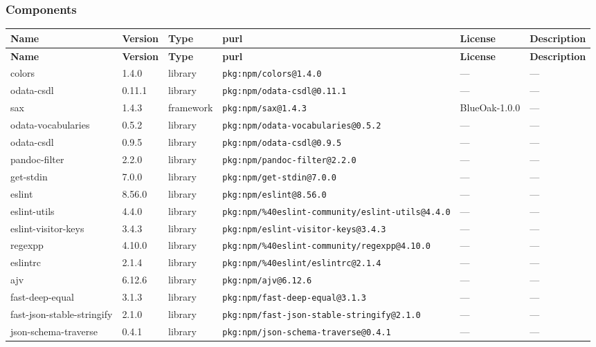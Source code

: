 \documentclass[11pt]{article}
\begin{document}
\subsubsection*{Components}
\begin{longtable}{|l|l|l|p{2.2cm}|l|p{4cm}|}
\hline
\textbf{Name} & \textbf{Version} & \textbf{Type} & \textbf{purl} & \textbf{License} & \textbf{Description} \\
\hline
\endfirsthead
\hline
\textbf{Name} & \textbf{Version} & \textbf{Type} & \textbf{purl} & \textbf{License} & \textbf{Description} \\
\hline
\endhead
colors & 1.4.0 & library & \texttt{pkg:npm/colors@1.4.0} & — & — \\
odata-csdl & 0.11.1 & library & \texttt{pkg:npm/odata-csdl@0.11.1} & — & — \\
sax & 1.4.3 & framework & \texttt{pkg:npm/sax@1.4.3} & BlueOak-1.0.0 & — \\
odata-vocabularies & 0.5.2 & library & \texttt{pkg:npm/odata-vocabularies@0.5.2} & — & — \\
odata-csdl & 0.9.5 & library & \texttt{pkg:npm/odata-csdl@0.9.5} & — & — \\
pandoc-filter & 2.2.0 & library & \texttt{pkg:npm/pandoc-filter@2.2.0} & — & — \\
get-stdin & 7.0.0 & library & \texttt{pkg:npm/get-stdin@7.0.0} & — & — \\
eslint & 8.56.0 & library & \texttt{pkg:npm/eslint@8.56.0} & — & — \\
eslint-utils & 4.4.0 & library & \texttt{pkg:npm/\%40eslint-community/eslint-utils@4.4.0} & — & — \\
eslint-visitor-keys & 3.4.3 & library & \texttt{pkg:npm/eslint-visitor-keys@3.4.3} & — & — \\
regexpp & 4.10.0 & library & \texttt{pkg:npm/\%40eslint-community/regexpp@4.10.0} & — & — \\
eslintrc & 2.1.4 & library & \texttt{pkg:npm/\%40eslint/eslintrc@2.1.4} & — & — \\
ajv & 6.12.6 & library & \texttt{pkg:npm/ajv@6.12.6} & — & — \\
fast-deep-equal & 3.1.3 & library & \texttt{pkg:npm/fast-deep-equal@3.1.3} & — & — \\
fast-json-stable-stringify & 2.1.0 & library & \texttt{pkg:npm/fast-json-stable-stringify@2.1.0} & — & — \\
json-schema-traverse & 0.4.1 & library & \texttt{pkg:npm/json-schema-traverse@0.4.1} & — & — \\

\end{longtable}
\end{document}

